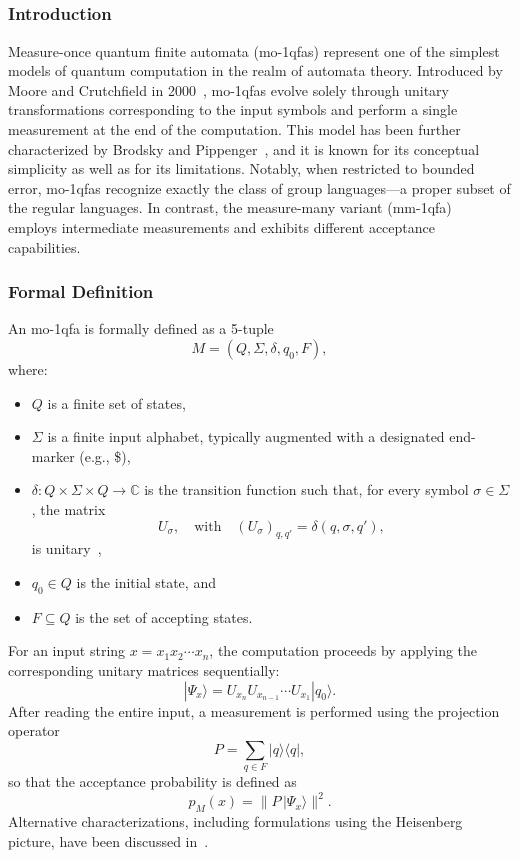 \subsection{}
\label{sec:moqfa}

\subsubsection{Introduction}
Measure-once quantum finite automata (\gls{mo-1qfa}s) represent one of the simplest models of quantum computation in the realm of automata theory. Introduced by Moore and Crutchfield in 2000~\cite{moore2000quantum}, \gls{mo-1qfa}s evolve solely through unitary transformations corresponding to the input symbols and perform a single measurement at the end of the computation. This model has been further characterized by Brodsky and Pippenger~\cite{brodsky2002characterizations}, and it is known for its conceptual simplicity as well as for its limitations. Notably, when restricted to bounded error, \gls{mo-1qfa}s recognize exactly the class of group languages—a proper subset of the regular languages. In contrast, the measure-many variant (\gls{mm-1qfa})~\cite{646094} employs intermediate measurements and exhibits different acceptance capabilities.

\subsubsection{Formal Definition}
An \gls{mo-1qfa} is formally defined as a 5-tuple 
\[
M = (Q,\Sigma,\delta,q_0,F),
\]
where:
\begin{itemize}
    \item $Q$ is a finite set of states,
    \item $\Sigma$ is a finite input alphabet, typically augmented with a designated end-marker (e.g., \$),
    \item $\delta : Q \times \Sigma \times Q \to \mathbb{C}$ is the transition function such that, for every symbol $\sigma\in\Sigma$, the matrix 
    \[
    U_\sigma,\quad \text{with} \quad (U_\sigma)_{q,q'} = \delta(q,\sigma,q'),
    \]
    is unitary~\cite{moore2000quantum},
    \item $q_0 \in Q$ is the initial state, and
    \item $F\subseteq Q$ is the set of accepting states.
\end{itemize}
For an input string $x=x_1x_2\cdots x_n$, the computation proceeds by applying the corresponding unitary matrices sequentially:
\[
|\Psi_x\rangle = U_{x_n}U_{x_{n-1}}\cdots U_{x_1}|q_0\rangle.
\]
After reading the entire input, a measurement is performed using the projection operator
\[
P=\sum_{q\in F} |q\rangle\langle q|,
\]
so that the acceptance probability is defined as
\[
p_M(x)=\|P\,|\Psi_x\rangle\|^2.
\]
Alternative characterizations, including formulations using the Heisenberg picture, have been discussed in~\cite{QIU2004479,10.1007/978-3-031-16336-4_18}.

